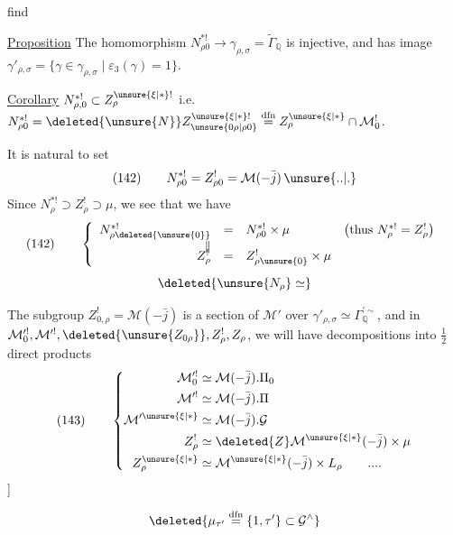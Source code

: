 
find

\uline{Proposition} The homomorphism
$N_{\rho0}^{*!}\longrightarrow\gamma_{\rho,\sigma}=\widetilde\Gamma_{\mathbb Q}$
is injective, and has image
$\gamma'_{\rho,\sigma}=\{\gamma\in\gamma_{\rho,\sigma}\mid\varepsilon_3(\gamma)=1\}$.

\uline{Corollary}
$N_{\rho,0}^{*!}\subset Z_{\rho}^{\unsure{\xi|*}!}$ i.e.
$N_{\rho0}^{*!}=\deleted{\unsure{N}}Z_{\unsure{0\rho|\rho0}}^{\unsure{\xi|*}!}
 \overset{\mathrm{dfn}}{=}Z_{\rho}^{\unsure{\xi|*}}\cap\mathcal M_0^!$.

It is natural to set
\[
 (142)\qquad N_{\rho0}^{*!}=Z_{\rho0}^!=\mathcal M(-\bar j)\,\unsure{..|.}
\]
Since $N_{\rho}^{*!}\supset Z_{\rho}^!\supset\mu$, we see that we have
\[
 (142)\qquad
 \left\{\begin{array}{rcll}
 N_{\rho\deleted{\unsure{0}}}^{*!}&=&N_{\rho0}^{*!}\times\mu
     &\bigl(\text{thus }N_{\rho}^{*!}=Z_{\rho}^!\bigr)\\
 \Vert&&&\\[-1ex]
 Z_{\rho}^!&=&Z_{\rho\unsure{0}}^!\times\mu&
 \end{array}\right.
\]
\[
 \deleted{\unsure{N_{\rho}}\simeq}
\]

The subgroup $Z^!_{0,\rho}=\mathcal M(-\bar j)$ is a section of
$\mathcal M'$ over $\gamma'_{\rho,\sigma}\simeq\Gamma_{\mathbb Q}^{\prime\sim}$,
and  
 in
$\mathcal M_0^{\prime!},\mathcal M^{\prime!},
 \deleted{\unsure{Z_{0\rho}}},Z_{\rho}^!,Z_{\rho}$,
we will have decompositions into $\frac12$ direct products
\[
 (143)\qquad
 \left\{\begin{aligned}
 \mathcal M_0^{\prime!}&\simeq\mathcal M(-\bar j).\Pi_0\\
 \mathcal M^{\prime!}&\simeq\mathcal M(-\bar j).\Pi\\
 \mathcal M^{\prime\unsure{\xi|*}}&\simeq\mathcal M(-\bar j).\mathcal G\\
 Z_{\rho}^!&\simeq\deleted{Z}\mathcal M^{\unsure{\xi|*}}(-\bar j)\times\mu\\
 Z_{\rho}^{\unsure{\xi|*}}&\simeq\mathcal M^{\unsure{\xi|*}}(-\bar j)\times L_{\rho}
 \qquad ....
 \end{aligned}\right.
\]
]

\[
 \deleted{\mu_{\tau'}\overset{\mathrm{dfn}}{=}\{1,\tau'\}\subset\mathcal G^{\wedge}}
\]
